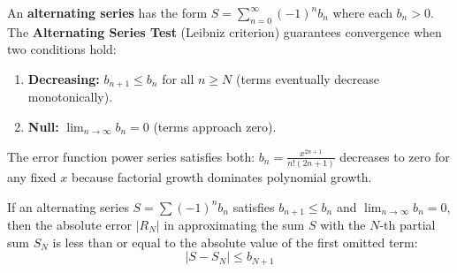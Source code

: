 \documentclass[11pt]{article}
\begin{document}
\begin{defnbox}
An \textbf{alternating series} has the form $\displaystyle S = \sum_{n=0}^{\infty}(-1)^n b_n$ where each $b_n > 0$. The \textbf{Alternating Series Test} (Leibniz criterion) guarantees convergence when two conditions hold:
\begin{enumerate}[leftmargin=1.5em]
    \item \textbf{Decreasing:} $b_{n+1} \le b_n$ for all $n \ge N$ (terms eventually decrease monotonically).
    \item \textbf{Null:} $\displaystyle\lim_{n \to \infty} b_n = 0$ (terms approach zero).
\end{enumerate}
The error function power series satisfies both: $b_n = \frac{x^{2n+1}}{n!(2n+1)}$ decreases to zero for any fixed $x$ because factorial growth dominates polynomial growth.
\end{defnbox}

\begin{theorembox}
If an alternating series $S = \sum (-1)^n b_n$ satisfies $b_{n+1} \le b_n$ and $\lim_{n \to \infty} b_n = 0$, then the absolute error $|R_N|$ in approximating the sum $S$ with the $N$-th partial sum $S_N$ is less than or equal to the absolute value of the first omitted term:
\[ |S - S_N| \le b_{N+1} \]
\end{theorembox}
\end{document}
